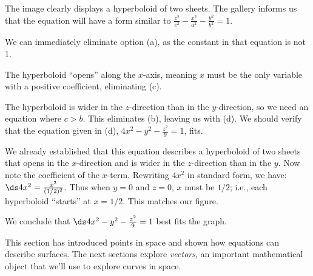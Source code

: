 {The image clearly displays a hyperboloid of two sheets. The gallery informs us that the equation will have a form similar to $\frac{z^2}{c^2}-\frac{x^2}{a^2}-\frac{y^2}{b^2}=1$. 

We can immediately eliminate option (a), as the constant in that equation is not 1.

The hyperboloid ``opens'' along the $x$-axis, meaning $x$ must be the only variable with a  positive coefficient, eliminating (c).

The hyperboloid is wider in the $z$-direction than in the $y$-direction, so we need an equation where $c>b$. This eliminates (b), leaving us with (d). We should verify that the equation given in (d), $4x^2-y^2-\frac{z^2}9=1$, fits.

We already established that this equation describes a hyperboloid of two sheets that opens in the $x$-direction and is wider in the $z$-direction than in the $y$. Now note the coefficient of the $x$-term. Rewriting $4x^2$ in standard form, we have: $\ds 4x^2 = \frac{x^2}{(1/2)^2}$. Thus when $y=0$ and $z=0$, $x$ must be $1/2$; i.e., each hyperboloid ``starts'' at $x=1/2$. This matches our figure.

We conclude that $\ds 4x^2-y^2-\frac{z^2}9=1$ best fits the graph.}

This section has introduced points in space and shown how equations can describe surfaces. The next sections explore \emph{vectors}, an important mathematical object that we'll use to explore curves in space.

